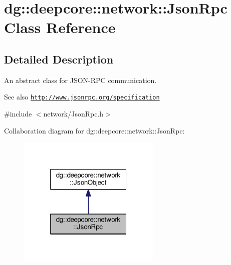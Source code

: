 \hypertarget{classdg_1_1deepcore_1_1network_1_1_json_rpc}{}\section{dg\+:\+:deepcore\+:\+:network\+:\+:Json\+Rpc Class Reference}
\label{classdg_1_1deepcore_1_1network_1_1_json_rpc}


\subsection{Detailed Description}
An abstract class for J\+S\+O\+N-\/\+R\+PC communication. 

\begin{DoxySeeAlso}{See also}
\href{http://www.jsonrpc.org/specification}{\tt http\+://www.\+jsonrpc.\+org/specification} 
\end{DoxySeeAlso}


{\ttfamily \#include $<$network/\+Json\+Rpc.\+h$>$}



Collaboration diagram for dg\+:\+:deepcore\+:\+:network\+:\+:Json\+Rpc\+:
\nopagebreak
\begin{figure}[H]
\begin{center}
\leavevmode
\includegraphics[width=193pt]{classdg_1_1deepcore_1_1network_1_1_json_rpc__coll__graph}
\end{center}
\end{figure}
